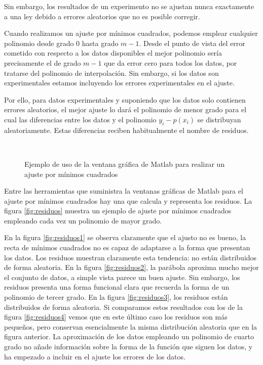 Sin embargo, los resultados de un experimento no se ajustan nunca exactamente a una ley debido a errores aleatorios que no es posible corregir.

Cuando realizamos un ajuste por mínimos cuadrados, podemos emplear cualquier polinomio desde grado $0$ hasta grado $m-1$. Desde el punto de vista del error cometido con respecto a los datos disponibles el mejor polinomio sería precisamente el de grado $m-1$ que da error cero para todos los datos, por tratarse del polinomio de interpolación. Sin embargo, si los datos son experimentales estamos incluyendo los errores experimentales en el ajuste.

Por ello, para datos experimentales y suponiendo que los datos solo contienen errores aleatorios, el mejor ajuste lo dará el polinomio de menor grado para el cual las diferencias entre los datos y el polinomio $y_i-p(x_i)$ se distribuyan aleatoriamente. Estas diferencias reciben habitualmente el nombre de residuos.  

\begin{figure}[h]
\centering
{} \qquad 
{}\\
\caption{Ejemplo de uso de la ventana gráfica de Matlab para realizar un ajuste por mínimos cuadrados}
\label{fig:minimos}
\end{figure}


Entre las herramientas que suministra la ventanas gráficas de Matlab para el ajuste por mínimos cuadrados hay una que calcula y representa los residuos.  La figura \ref{fig:residuos} muestra un ejemplo de ajuste por mínimos cuadrados empleando cada vez un polinomio de mayor grado. 
  
  
En la figura \ref{fig:residuos1} se observa claramente que el ajusto no es bueno, la recta de mínimos cuadrados no es capaz de adaptarse a la forma que presentan los datos. Los residuos muestran claramente esta tendencia: no están distribuidos de forma aleatoria. En la figura \ref{fig:residuos2}, la parábola aproxima mucho mejor el conjunto de datos, a simple vista parece un buen ajuste. Sin embargo, los residuos presenta una forma funcional clara que recuerda la forma de un polinomio de tercer grado. En la figura \ref{fig:residuos3}, los residuos están distribuidos de forma aleatoria. Si comparamos estos resultados con los de la figura \ref{fig:residuos4} vemos que en este último caso los residuos son más pequeños, pero conservan esencialmente la misma distribución aleatoria que en la figura anterior. La aproximación de los datos empleando un polinomio de cuarto grado no añade información sobre la forma de la función que siguen los datos, y ha empezado a incluir en el ajuste los errores de los datos. 

